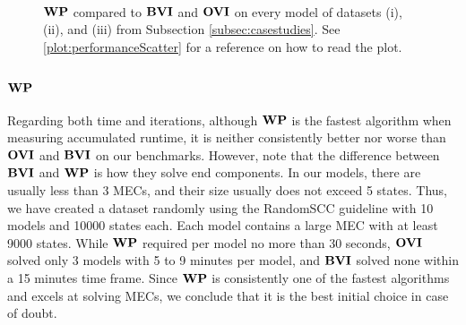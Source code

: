 \begin{figure}[h!]
    \centering
    \
    \caption{$\mathbf{WP}$ compared to $\mathbf{BVI}$ and $\mathbf{OVI}$ on every model of datasets (i), (ii), and (iii) from Subsection \ref{subsec:casestudies}. See \ref{plot:performanceScatter} for a reference on how to read the plot.}%
    \label{fig:WPvsBVIvsOVI}%
    \end{figure}
\FloatBarrier

\subsubsection*{\underline{$\mathbf{WP}$}} \label{subsubsec:wpPerform}
Regarding both time and iterations, although $\mathbf{WP}$ is the fastest algorithm when measuring accumulated runtime, it is neither consistently better nor worse than $\mathbf{OVI}$ and $\mathbf{BVI}$ on our benchmarks.
However, note that the difference between $\mathbf{BVI}$ and $\mathbf{WP}$ is how they solve end components. In our models, there are usually less than 3 MECs, and their size usually does not exceed 5 states.
Thus, we have created a dataset randomly using the RandomSCC guideline with 10 models and 10000 states each. Each model contains a large MEC with at least 9000 states.
While $\mathbf{WP}$ required per model no more than 30 seconds, $\mathbf{OVI}$ solved only 3 models with 5 to 9 minutes per model, and $\mathbf{BVI}$ solved none within a 15 minutes time frame. 
Since $\mathbf{WP}$ is consistently one of the fastest algorithms and excels at solving MECs, we conclude that it is the best initial choice in case of doubt.

